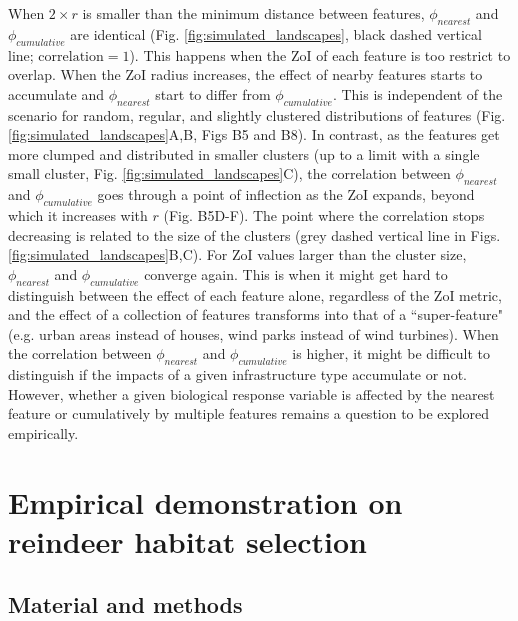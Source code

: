\documentclass[titlepage]{article}
\begin{document}
When $2 \times r$ is smaller than the minimum distance between features, $\phi_{nearest}$ and $\phi_{cumulative}$ are identical (Fig. \ref{fig:simulated_landscapes}, black dashed vertical line; $\text{correlation} = 1$). This happens when the ZoI of each feature is too restrict to overlap. When the ZoI radius increases, the effect of nearby features starts to accumulate and $\phi_{nearest}$ start to differ from $\phi_{cumulative}$. This is independent of the scenario for random, regular, and slightly clustered distributions of features (Fig. \ref{fig:simulated_landscapes}A,B, Figs B5 and B8). In contrast, as the features get more clumped and distributed in smaller clusters (up to a limit with a single small cluster, Fig. \ref{fig:simulated_landscapes}C), the correlation between $\phi_{nearest}$ and $\phi_{cumulative}$ goes through a point of inflection as the ZoI expands, beyond which it increases with $r$ (Fig. B5D-F). The point where the correlation stops decreasing is related to the size of the clusters (grey dashed vertical line in Figs. \ref{fig:simulated_landscapes}B,C). For ZoI values larger than the cluster size, $\phi_{nearest}$ and $\phi_{cumulative}$ converge again. %
This is when it might get hard to distinguish between the effect of each feature alone, regardless of the ZoI metric, and the effect of a collection of features transforms into that of a ``super-feature" (e.g. urban areas instead of houses, wind parks instead of wind turbines). 
When the correlation between $\phi_{nearest}$ and $\phi_{cumulative}$ is higher, it might be difficult to distinguish if the impacts of a given infrastructure type accumulate or not. 
However, whether a given biological response variable is affected by the nearest feature or cumulatively by multiple features remains a question to be explored empirically. 

\section{Empirical demonstration on reindeer habitat selection}

\subsection{Material and methods}
\end{document}
